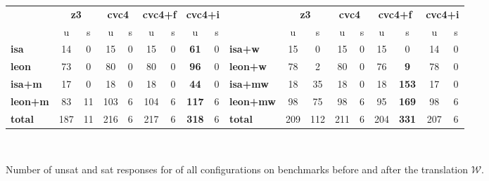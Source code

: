 \documentclass[runningheads,a4paper]{llncs}
\newcommand{\conv}{\mathcal{W}}
\begin{document}
\begin{figure}[t]
\centering
{
\begin{tabular}{|l|cc|cc|cc|cc|l|cc|cc|cc|cc|}
\hline                                                                
  & \multicolumn{2}{c|}{{\bf z3}}     & \multicolumn{2}{c|}{{\bf cvc4}}     & \multicolumn{2}{c|}{{\bf cvc4+f}}     & \multicolumn{2}{c|}{{\bf cvc4+i}}     & & \multicolumn{2}{c|}{{\bf z3}}     & \multicolumn{2}{c|}{{\bf cvc4}}     & \multicolumn{2}{c|}{{\bf cvc4+f}}     & \multicolumn{2}{c|}{{\bf cvc4+i}}     
\\                                                                    
  & u & s & u & s & u & s & u & s & & u & s & u & s & u & s & u & s 
\\                                                                    
\hline                                                                    
{\bf isa} & 14  & 0 & 15  & 0 & 15  & 0 & {\bf 61}  & 0 & {\bf isa+w} & 15  & 0 & 15  & 0 & 15  & 0 & 14  & 0
\\                                                                  
{\bf leon}  & 73  & 0 & 80  & 0 & 80  & 0 & {\bf 96}  & 0 & {\bf leon+w}  & 78  & 2 & 80  & 0 & 76  & {\bf 9} & 78  & 0
\\                                                                   
{\bf isa+m} & 17  & 0 & 18  & 0 & 18  & 0 & {\bf 44}  & 0 & {\bf isa+mw}  & 18  & 35  & 18  & 0 & 18  & {\bf 153} & 17  & 0
\\                                                                  
{\bf leon+m}  & 83  & 11  & 103 & 6 & 104 & 6 & {\bf 117} & 6 & {\bf leon+mw} & 98  & 75  & 98  & 6 & 95  & {\bf 169} & 98  & 6
\\                                                                  
\hline                                                             
{\bf total} & 187 & 11  & 216 & 6 & 217 & 6 & {\bf 318} & 6 & {\bf total} & 209 & 112 & 211 & 6 & 204 & {\bf 331} & 207 & 6
\\                                                                                            
\hline                                                                                            
\end{tabular}
\\
}
\caption{Number of unsat and sat responses for of all configurations on benchmarks 
before and after the translation $\conv$.}
\label{fig:results}
\end{figure}
\end{document}
